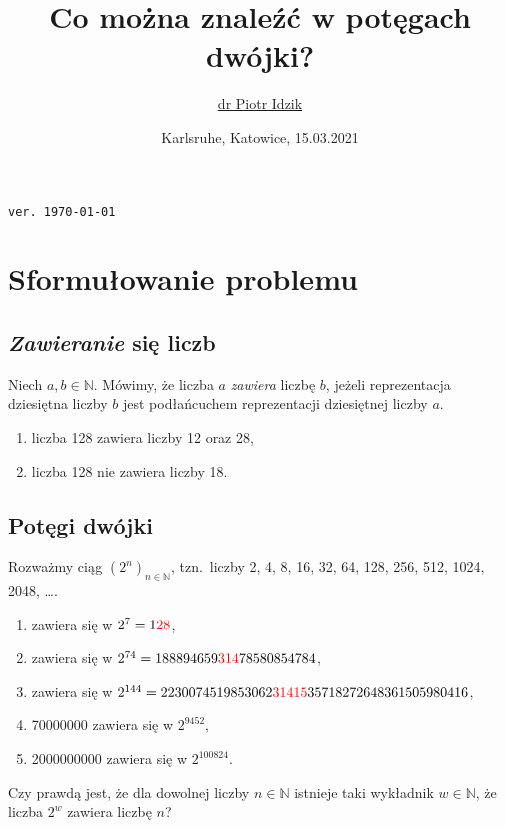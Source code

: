 \documentclass[aspectratio=169]{beamer}
\author{\texorpdfstring{\href{\myLinkedinLink}{dr Piotr Idzik} \\ \email{\myEmail}}{dr Piotr Idzik}}
\title{Co można znaleźć w potęgach dwójki?}
\date{Karlsruhe, Katowice, 15.03.2021}
\newcommand{\enumsymbol}{$\triangleright$}
\newcommand{\colora}[1]{{\color{red}{#1}}}
\newcommand{\N}{\mathbb{N}}
\newcommand{\myLinkedinLink}{https://www.linkedin.com/in/piotr-idzik-34b572151/}
\newcommand{\myGithubLink}{https://github.com/vil02/}
\newcommand{\myLinkedin}{\href{\myLinkedinLink}{\faLinkedinSquare}}
\newcommand{\myGithub}{\href{\myGithubLink}{\faGithubSquare}}
\newcommand{\define}[1]{\textcolor{colorOfDefinition}{\textit{#1}}}
\begin{document}
\begin{frame}[plain]
\maketitle

\myLinkedin{}
\myGithub{}
\hfill \textcolor[rgb]{0.85,0.85,0.85}{\texttt{\tiny{ver. \today\ \currenttime\/}}}
\end{frame}
\section{Sformułowanie problemu}
\subsection{\define{Zawieranie} się liczb}
\begin{frame}
  \begin{definition}
    Niech $a, b \in \N$.
    Mówimy, że liczba $a$ \define{zawiera} liczbę $b$,
    jeżeli reprezentacja dziesiętna liczby $b$ jest podłańcuchem reprezentacji dziesiętnej liczby $a$.
  \end{definition}
  \pause{}
  \begin{example}
    \begin{enumerate}[label=\enumsymbol]
      \item<+-> liczba 128 zawiera liczby 12 oraz 28,
      \item<+-> liczba 128 nie zawiera liczby 18.
    \end{enumerate}
  \end{example}
\end{frame}
\subsection{Potęgi dwójki}
\begin{frame}
  Rozważmy ciąg ${(2^n)}_{n \in \N}$, tzn.\ liczby 2, 4, 8, 16, 32, 64, 128, 256, 512, 1024, 2048, \ldots{}.
  \pause{}
  \begin{enumerate}[label=\enumsymbol]
    \item<+-> \colora{28} zawiera się w $2^7 = 1\colora{28}$,
    \item<+-> \colora{314} zawiera się w $2^{74} = 188894659\colora{314}78580854784$,
    \item<+-> \colora{31415} zawiera się w $2^{144} = 2230074519853062\colora{31415}35718272648361505980416$,
    \item<+-> 70000000 zawiera się w $2^{9452}$,
    \item<+-> 2000000000 zawiera się w $2^{100824}$.
  \end{enumerate}
  \onslide<+-> Czy prawdą jest, że dla dowolnej liczby $n \in \N$ istnieje taki wykładnik $w \in \N$, że liczba $2^w$ zawiera liczbę $n$?
\end{frame}
\end{document}
